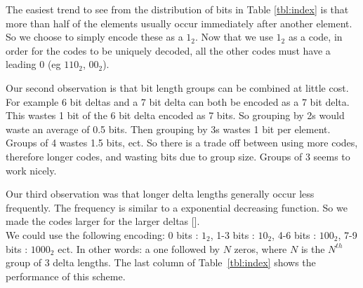 

The easiest trend to see from the distribution of bits in Table \ref{tbl:index} is that more than half of the elements usually occur immediately after another element. So we choose to simply encode these as a $1_2$. Now that we use $1_2$ as a code, in order for the codes to be uniquely decoded, all the other codes must have a leading 0 (eg $110_2$, $00_2$). \par
Our second observation is that bit length groups can be combined at little cost. For example 6 bit deltas and a 7 bit delta can both be encoded as a 7 bit delta. This wastes 1 bit of the 6 bit delta encoded as 7 bits. So grouping by 2s would waste an average of 0.5 bits. Then grouping by 3s wastes 1 bit per element. Groups of 4 wastes 1.5 bits, ect. So there is a trade off between using more codes, therefore longer codes, and wasting bits due to group size. Groups of 3 seems to work nicely.\par
Our third observation was that longer delta lengths generally occur less frequently. The frequency is similar to a exponential decreasing function. So we made the codes larger for the larger deltas [\cite{prelim:salomon}].\\
\indent We could use the following encoding: 0 bits : $1_2$, 1-3 bits : $10_2$, 4-6 bits : $100_2$, 7-9 bits : $1000_2$ ect. In other words: a one followed by $N$ zeros, where $N$ is the $N^{th}$ group of 3 delta lengths. The last column of Table~\ref{tbl:index} shows the performance of this scheme.

